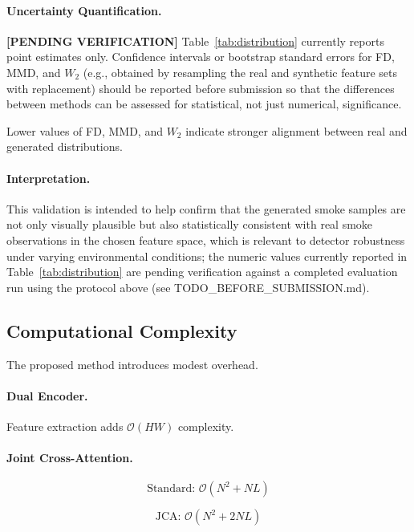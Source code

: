 \documentclass[journal]{IEEEtran}
\begin{document}
\paragraph{Uncertainty Quantification.}
\textbf{[PENDING VERIFICATION]} Table~\ref{tab:distribution} currently
reports point estimates only. Confidence intervals or bootstrap standard
errors for FD, MMD, and $W_2$ (e.g., obtained by resampling the real and
synthetic feature sets with replacement) should be reported before
submission so that the differences between methods can be assessed for
statistical, not just numerical, significance.

Lower values of FD, MMD, and $W_2$ indicate stronger alignment between
real and generated distributions.

\paragraph{Interpretation.}
This validation is intended to help confirm that the generated smoke
samples are not only visually plausible but also statistically consistent
with real smoke observations in the chosen feature space, which is
relevant to detector robustness under varying environmental conditions;
the numeric values currently reported in Table~\ref{tab:distribution} are
pending verification against a completed evaluation run using the
protocol above (see TODO\_BEFORE\_SUBMISSION.md).
\subsection{Computational Complexity}
\label{sec:complexity}

The proposed method introduces modest overhead.

\paragraph{Dual Encoder.}

Feature extraction adds $\mathcal{O}(HW)$ complexity.

\paragraph{Joint Cross-Attention.}

\begin{equation}
\text{Standard: } \mathcal{O}(N^2 + NL)
\end{equation}

\begin{equation}
\text{JCA: } \mathcal{O}(N^2 + 2NL)
\end{equation}
\end{document}
